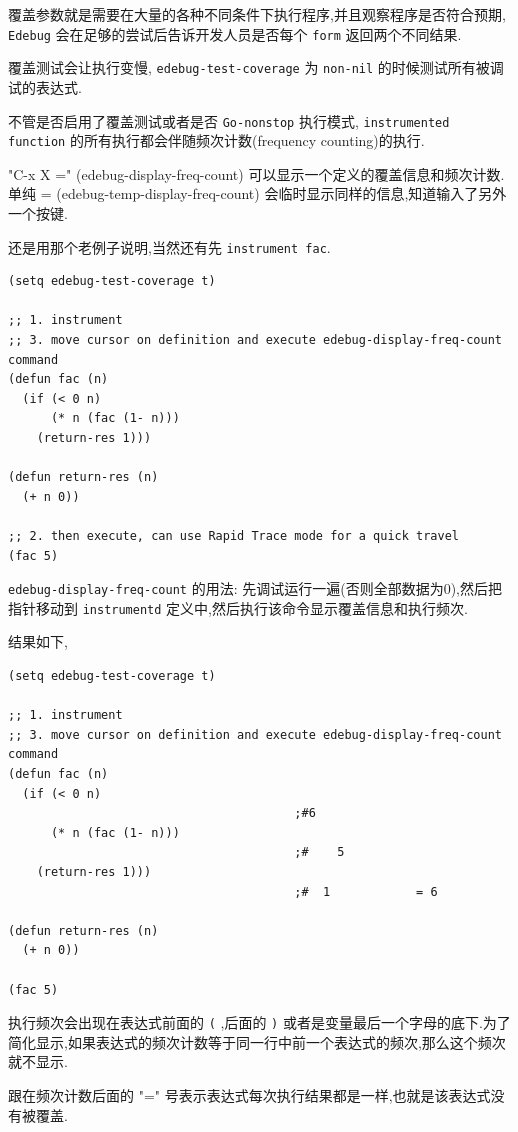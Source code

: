 \documentclass[11pt]{article}
\begin{document}
\begin{enumerate}
覆盖参数就是需要在大量的各种不同条件下执行程序,并且观察程序是否符合预期, \texttt{Edebug} 会在足够的尝试后告诉开发人员是否每个 \texttt{form} 返回两个不同结果.

覆盖测试会让执行变慢, \texttt{edebug-test-coverage} 为 \texttt{non-nil} 的时候测试所有被调试的表达式.

不管是否启用了覆盖测试或者是否 \texttt{Go-nonstop} 执行模式, \texttt{instrumented function} 的所有执行都会伴随频次计数(frequency counting)的执行.

"C-x X =" (edebug-display-freq-count) 可以显示一个定义的覆盖信息和频次计数. 单纯 = (edebug-temp-display-freq-count) 会临时显示同样的信息,知道输入了另外一个按键.

还是用那个老例子说明,当然还有先 \texttt{instrument fac}.

\begin{verbatim}
(setq edebug-test-coverage t)

;; 1. instrument
;; 3. move cursor on definition and execute edebug-display-freq-count command
(defun fac (n)
  (if (< 0 n)
      (* n (fac (1- n)))
    (return-res 1)))

(defun return-res (n)
  (+ n 0))

;; 2. then execute, can use Rapid Trace mode for a quick travel
(fac 5)
\end{verbatim}

\texttt{edebug-display-freq-count} 的用法: 先调试运行一遍(否则全部数据为0),然后把指针移动到 \texttt{instrumentd} 定义中,然后执行该命令显示覆盖信息和执行频次.

结果如下,

\begin{verbatim}
(setq edebug-test-coverage t)

;; 1. instrument
;; 3. move cursor on definition and execute edebug-display-freq-count command
(defun fac (n)
  (if (< 0 n)
                                        ;#6
      (* n (fac (1- n)))
                                        ;#    5
    (return-res 1)))
                                        ;#  1            = 6

(defun return-res (n)
  (+ n 0))

(fac 5)
\end{verbatim}

执行频次会出现在表达式前面的 \texttt{(} ,后面的 \texttt{)} 或者是变量最后一个字母的底下.为了简化显示,如果表达式的频次计数等于同一行中前一个表达式的频次,那么这个频次就不显示.

跟在频次计数后面的 "=" 号表示表达式每次执行结果都是一样,也就是该表达式没有被覆盖.


\end{enumerate}
\end{document}
